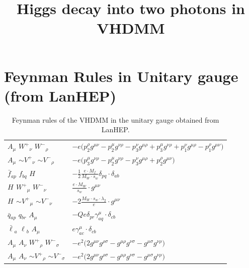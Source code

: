 \documentclass[a4paper,10pt]{article}
\title{\textbf{Higgs decay into two photons in VHDMM}}
\begin{document}
\maketitle
\tableofcontents

\newpage

\section{Feynman Rules in Unitary gauge (from LanHEP)}

\begin{table}[h]
\caption{Feynman rules of the VHDMM in the unitary gauge obtained from LanHEP.}
\begin{center}
\begin{tabular}{|l|l|} \hline
${A}_{\mu }$ \phantom{-} $W^+{}_{\nu }$ \phantom{-} $W^-{}_{\rho }$ \phantom{-}  &
	$- e\big(p_2^\rho g^{\mu \nu} -p_2^\mu g^{\nu \rho} -p_3^\nu g^{\mu \rho} +p_3^\mu g^{\nu \rho} +p_1^\nu g^{\mu \rho} -p_1^\rho g^{\mu \nu} \big)$\\[2mm]
${A}_{\mu }$ \phantom{-} $\sim V^+{}_{\nu }$ \phantom{-} $\sim V^-{}_{\rho }$ \phantom{-}  &
	$- e\big(p_3^\mu g^{\nu \rho} -p_2^\mu g^{\nu \rho} -p_3^\nu g^{\mu \rho} +p_2^\rho g^{\mu \nu} \big)$\\[2mm]
$\bar{f}{}_{a p }$ \phantom{-} $f{}_{b q }$ \phantom{-} ${H}_{}$ \phantom{-}  &
	$-\frac{1}{2}\frac{ e \cdot M_f}{ M_W \cdot s_w}\delta_{p q} \cdot \delta_{a b} $\\[2mm]
${H}_{}$ \phantom{-} $W^+{}_{\mu }$ \phantom{-} $W^-{}_{\nu }$ \phantom{-}  &
	$\frac{ e \cdot M_W}{ s_w}\cdot g^{\mu \nu} $\\[2mm]
${H}_{}$ \phantom{-} $\sim V^+{}_{\mu }$ \phantom{-} $\sim V^-{}_{\nu }$ \phantom{-}  &
	$-2\frac{ M_W \cdot s_w \cdot \lambda_2}{ e}\cdot g^{\mu \nu} $\\[2mm]
$\bar{q}{}_{a p }$ \phantom{-} $q{}_{b r }$ \phantom{-} ${A}_{\mu }$ \phantom{-}  &
	$-Q e\delta_{p r} \gamma_{a q}^\mu \cdot \delta_{c b} $\\[2mm]
$\bar{\ell}{}_{a }$ \phantom{-} $\ell{}_{b }$ \phantom{-} ${A}_{\mu }$ \phantom{-}  &
	$ e\gamma_{a c}^\mu \cdot \delta_{c b} $\\[2mm]
${A}_{\mu }$ \phantom{-} ${A}_{\nu }$ \phantom{-} $W^+{}_{\rho }$ \phantom{-} $W^-{}_{\sigma }$ \phantom{-}  &
	$- e{}^2 \big(2g^{\mu \nu} g^{\rho \sigma} -g^{\mu \rho} g^{\nu \sigma} -g^{\mu \sigma} g^{\nu \rho} \big)$\\[2mm] 
${A}_{\mu }$ \phantom{-} ${A}_{\nu }$ \phantom{-} $\sim V^+{}_{\rho }$ \phantom{-} $\sim V^-{}_{\sigma }$ \phantom{-}  &
	$- e{}^2 \big(2g^{\mu \nu} g^{\rho \sigma} -g^{\mu \rho} g^{\nu \sigma} -g^{\mu \sigma} g^{\nu \rho} \big)$\\[2mm] \hline
\end{tabular}
\end{center}
\end{table}
\end{document}
